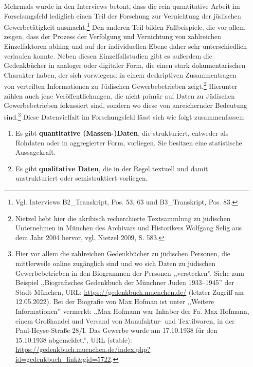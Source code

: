 Mehrmals wurde in den Interviews betont, dass die rein quantitative Arbeit im Forschungsfeld lediglich einen Teil der Forschung zur Vernichtung der jüdischen Gewerbetätigkeit ausmacht.\footnote{Vgl. Interviews B2\_Transkript, Pos. 53, 63 und B3\_Transkript, Pos. 83.} Den anderen Teil bilden Fallbeispiele, die vor allem zeigen, dass der Prozess der Verfolgung und Vernichtung von zahlreichen Einzelfaktoren abhing und auf der individuellen Ebene daher sehr unterschiedlich verlaufen konnte. Neben diesen Einzelfallstudien gibt es außerdem die Gedenkbücher in analoger oder digitaler Form, die einen stark dokumentarischen Charakter haben, der sich vorwiegend in einem deskriptiven Zusammentragen von verteilten Informationen zu Jüdischen Gewerbebetrieben zeigt.\footnote{Nietzel hebt hier die akribisch recherchierte Textsammlung zu jüdischen Unternehmen in München des Archivars und Historikers Wolfgang Selig aus dem Jahr 2004 hervor, vgl. Nietzel 2009, S. 583.} Hierunter zählen auch jene Veröffentlichungen, die nicht primär auf Daten zu Jüdischen Gewerbebetrieben fokussiert sind, sondern wo diese von anreichernder Bedeutung sind.\footnote{Hier vor allem die zahlreichen Gedenkbücher zu jüdischen Personen, die mittlerweile online zugänglich sind und wo sich Daten zu jüdischen Gewerbebetrieben in den Biogrammen der Personen ,,verstecken''. Siehe zum Beispiel ,,Biografisches Gedenkbuch der Münchner Juden 1933–1945'' der Stadt München, URL: \url{https://gedenkbuch.muenchen.de/} (letzter Zugriff am 12.05.2022). Bei der Biografie von Max Hofman ist unter ,,Weitere Informationen'' vermerkt: ,,Max Hofmann war Inhaber der Fa. Max Hofmann, einem Großhandel und Versand von Manufaktur- und Textilwaren, in der Paul-Heyse-Straße 28/I. Das Gewerbe wurde am 17.10.1938 für den 15.10.1938 abgemeldet.'', URL (stable): \url{https://gedenkbuch.muenchen.de/index.php?id=gedenkbuch_link&gid=5722}.} Diese Datenvielfalt im Forschungsfeld lässt sich wie folgt zusammenfassen: 

\begin{enumerate}
    \item Es gibt \textbf{quantitative (Massen-)Daten}, die strukturiert, entweder als Rohdaten oder in aggregierter Form, vorliegen. Sie besitzen eine statistische Aussagekraft.
    \item Es gibt \textbf{qualitative Daten}, die in der Regel textuell und damit unstrukturiert oder semistruktiert vorliegen.
\end{enumerate}

